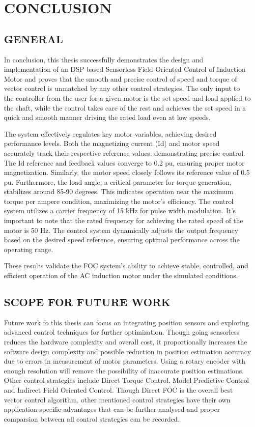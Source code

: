 \section{CONCLUSION}

\subsection{GENERAL}

In conclusion, this thesis successfully demonstrates the design and implementation of an DSP based Sensorless Field Oriented Control of Induction Motor and proves that the smooth and precise control of speed and torque of vector control is unmatched by any other control strategies. The only input to the controller from the user for a given motor is the set speed and load applied to the shaft, while the control takes care of the rest and achieves the set speed in a quick and smooth manner driving the rated load even at low speeds.

The system effectively regulates key motor variables, achieving desired performance levels. Both the magnetizing current (Id) and motor speed accurately track their respective reference values, demonstrating precise control. The Id reference and feedback values converge to 0.2 pu, ensuring proper motor magnetization. Similarly, the motor speed closely follows its reference value of 0.5 pu. Furthermore, the load angle, a critical parameter for torque generation, stabilizes around 85-90 degrees. This indicates operation near the maximum torque per ampere condition, maximizing the motor's efficiency. The control system utilizes a carrier frequency of 15 kHz for pulse width modulation.  It's important to note that the rated frequency for achieving the rated speed of the motor is 50 Hz. The control system dynamically adjusts the output frequency based on the desired speed reference, ensuring optimal performance across the operating range. 

These results validate the FOC system's ability to achieve stable, controlled, and efficient operation of the AC induction motor under the simulated conditions. 

\subsection{SCOPE FOR FUTURE WORK}

Future work fo this thesis can focus on integrating position sensors and exploring advanced control techniques for further optimization. Though going sensorless reduces the hardware complexity and overall cost, it proportionally increases the software design complexity and possible reduction in position estimation accuracy due to errors in measurement of motor parameters. Using a rotary encoder with enough resolution will remove the possibility of inaccurate position estimations. Other control strategies include Direct Torque Control, Model Predictive Control and Indirect Field Oriented Control. Though Direct FOC is the overall best vector control algorithm, other mentioned control strategies have their own application specific advantages that can be further analysed and proper comparsion between all control strategies can be recorded.


